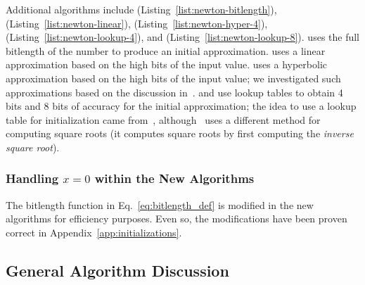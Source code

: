 Additional algorithms include
\BitLength{} (Listing~\ref{list:newton-bitlength}),
\Linear{} (Listing~\ref{list:newton-linear}),
\HyperFour{} (Listing~\ref{list:newton-hyper-4}),
\LookupFour{} (Listing~\ref{list:newton-lookup-4}), and
\LookupEight{} (Listing~\ref{list:newton-lookup-8}).
\BitLength{} uses the full bitlength of the number to produce
an initial approximation.
\Linear{} uses a linear approximation based on the high bits
of the input value.
\HyperFour{} uses a hyperbolic approximation
based on the high bits of the input value;
we investigated such approximations
based on the discussion in~\cite{WikiSqrtHyper}.
\LookupFour{} and \LookupEight{} use lookup tables
to obtain 4 bits and 8 bits of accuracy for the initial approximation;
the idea to use a lookup table for initialization
came from~\cite{WikiSqrtBinary,FormalVerIsqrt},
although~\cite{FormalVerIsqrt} uses a different method for
computing square roots
(it computes square roots by first computing the \emph{inverse square root}).













\subsubsection{Handling $x=0$ within the New Algorithms}

The \textsf{bitlength} function in Eq.~\eqref{eq:bitlength_def}
is modified in the new algorithms for efficiency purposes.
Even so, the modifications have been proven correct
in Appendix~\ref{app:initializations}.


\subsection{General Algorithm Discussion}

